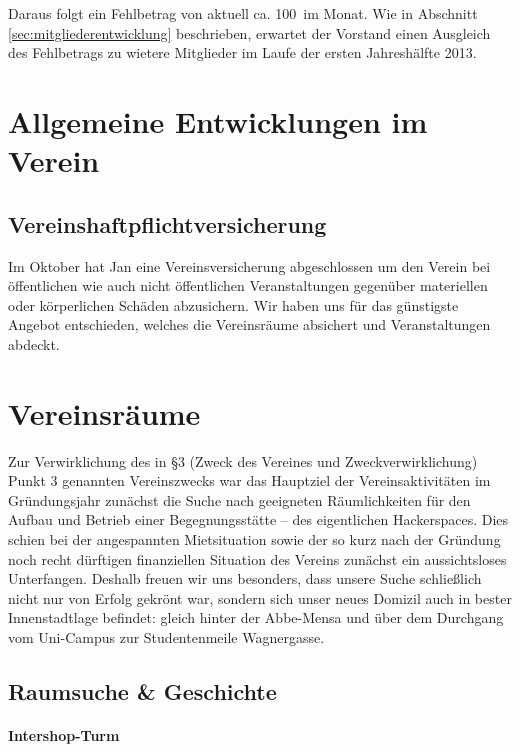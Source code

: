 \documentclass[10pt,DIV16]{scrartcl}
\begin{document}
Daraus folgt ein Fehlbetrag von aktuell ca. 100\EUR\ im Monat. Wie 
in Abschnitt \ref{sec:mitgliederentwicklung} beschrieben, erwartet 
der Vorstand einen Ausgleich des Fehlbetrags zu wietere Mitglieder 
im Laufe der ersten Jahreshälfte 2013. 

\section{Allgemeine Entwicklungen im Verein}

\subsection{Vereinshaftpflichtversicherung}

Im Oktober hat Jan eine Vereinsversicherung abgeschlossen um den 
Verein bei öffentlichen wie auch nicht öffentlichen Veranstaltungen 
gegenüber materiellen oder körperlichen Schäden abzusichern. Wir 
haben uns für das günstigste Angebot entschieden, welches die 
Vereinsräume absichert und Veranstaltungen abdeckt.


\section{Vereinsräume}

Zur Verwirklichung des in §3 (Zweck des Vereines und Zweckverwirklichung)
Punkt 3 genannten Vereinszwecks war das Hauptziel der Vereinsaktivitäten im
Gründungsjahr zunächst die Suche nach geeigneten Räumlichkeiten für den Aufbau
und Betrieb einer Begegnungsstätte -- des eigentlichen Hackerspaces.  Dies
schien bei der angespannten Mietsituation sowie der so kurz nach der Gründung
noch recht dürftigen finanziellen Situation des Vereins zunächst ein
aussichtsloses Unterfangen.  Deshalb freuen wir uns besonders, dass unsere
Suche schließlich nicht nur von Erfolg gekrönt war, sondern sich unser neues
Domizil auch in bester Innenstadtlage befindet:  gleich hinter der Abbe-Mensa
und über dem Durchgang vom Uni-Campus zur Studentenmeile Wagnergasse.

\subsection{Raumsuche \& Geschichte}

\paragraph{Intershop-Turm}
\end{document}
